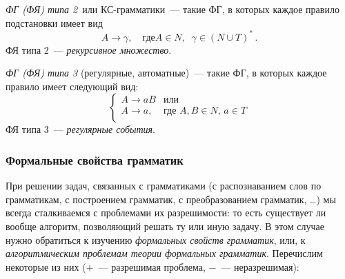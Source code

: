 \begin{defin}
  \emph{ФГ (ФЯ) типа 2}~или КС-грамматики~--- такие ФГ, в которых
  каждое правило подстановки имеет вид
  \begin{equation*}
    A \to \gamma,\quad \text{где} A \in N,\;\; \gamma \in (N \cup T)^*\,.
  \end{equation*}
  ФЯ типа 2~--- \emph{рекурсивное множество}.
\end{defin}

\begin{defin}
  \emph{ФГ (ФЯ) типа 3} (регулярные, автоматные)~--- такие ФГ, в
  которых каждое правило имеет следующий вид:
  $$
  \begin{cases}
    A \to aB & \text{или} \\
    A \to a, & \text{где $A,B \in N$, $a \in T$}\\
  \end{cases}
  $$
  ФЯ типа 3~--- \emph{регулярные события}.
\end{defin}


\subsubsection{Формальные свойства грамматик}

При решении задач, связанных с грамматиками (с распознаванием слов по
грамматикам, с построением грамматик, с преобразованием грамматик,
\ldots) мы всегда сталкиваемся с проблемами их разрешимости: то есть
существует ли вообще алгоритм, позволяющий решать ту или иную
задачу. В этом случае нужно обратиться к изучению \emph{формальных
  свойств грамматик}, или, к \emph{алгоритмическим проблемам теории
  формальных грамматик}. Перечислим некоторые из них ($+$~---
разрешимая проблема, $-$~--- неразрешимая):


